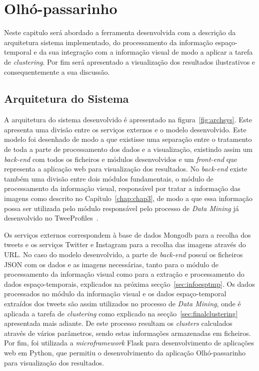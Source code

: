\chapter{Olhó-passarinho}\label{chap:chap4}

Neste capitulo será abordado a ferramenta desenvolvida com a descrição da arquitetura sistema implementado, do processamento da informação espaço-temporal e da sua integração com a informação visual de modo a aplicar a tarefa de \textit{clustering}. Por fim será apresentado a visualização dos resultados ilustrativos e consequentemente a sua discussão. 

\section{Arquitetura do Sistema}

A arquitetura do sistema desenvolvido é apresentado na figura~\ref{fig:archsys}. Este apresenta uma divisão entre os serviços externos e o modelo desenvolvido. Este modelo foi desenhado de modo a que existisse uma separação entre o tratamento de toda a parte de processamento dos dados e a visualização, existindo assim um \textit{back-end} com todos os ficheiros e módulos desenvolvidos e um \textit{front-end} que representa a aplicação web para visualização dos resultados. No \textit{back-end} existe também uma divisão entre dois módulos fundamentais, o módulo de processamento da informação visual, responsável por tratar a informação das imagens como descrito no Capítulo~\ref{chap:chap3}, de modo a que essa informação possa ser utilizada pelo módulo responsável pelo processo de \textit{Data Mining} já desenvolvido no TweeProfiles~\cite{Cunha2013}. 

Os serviços externos correspondem à base de dados Mongodb para a recolha dos tweets e os serviços Twitter e Instagram para a recolha das imagens através do URL. No caso do modelo desenvolvido, a parte de \textit{back-end} possuí os ficheiros JSON com os dados e as imagens necessárias, tanto para o módulo de processamento da informação visual como para a extração e processamento do dados espaço-temporais, explicados na próxima secção~\ref{sec:infoesptmp}. Os dados processados no módulo da informação visual e os dados espaço-temporal extraídos dos tweets são assim utilizados no processo de \textit{Data Mining}, onde é aplicada a tarefa de \textit{clustering} como explicado na secção~\ref{sec:finalclustering} apresentada mais adiante. De este processo resultam os \textit{clusters} calculados através de vários parâmetros, sendo estas informações armazenadas em ficheiros. Por fim, foi utilizada a \textit{microframework} Flask para desenvolvimento de aplicações web em Python, que permitiu o desenvolvimento da aplicação Olhó-passarinho para visualização dos resultados. 

